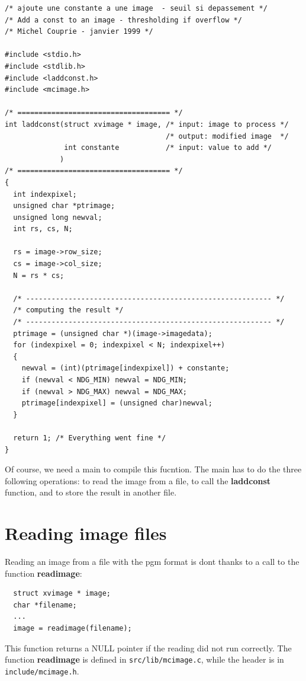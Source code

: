 \documentclass{article}
\begin{document}
\begin{verbatim}
/* ajoute une constante a une image  - seuil si depassement */
/* Add a const to an image - thresholding if overflow */
/* Michel Couprie - janvier 1999 */

#include <stdio.h>
#include <stdlib.h>
#include <laddconst.h>
#include <mcimage.h>

/* ==================================== */
int laddconst(struct xvimage * image, /* input: image to process */
                                      /* output: modified image  */
              int constante           /* input: value to add */
             )
/* ==================================== */
{
  int indexpixel;
  unsigned char *ptrimage;
  unsigned long newval;
  int rs, cs, N;

  rs = image->row_size;
  cs = image->col_size;
  N = rs * cs;
  
  /* ---------------------------------------------------------- */
  /* computing the result */
  /* ---------------------------------------------------------- */
  ptrimage = (unsigned char *)(image->imagedata);
  for (indexpixel = 0; indexpixel < N; indexpixel++)
  {
    newval = (int)(ptrimage[indexpixel]) + constante;
    if (newval < NDG_MIN) newval = NDG_MIN;
    if (newval > NDG_MAX) newval = NDG_MAX;
    ptrimage[indexpixel] = (unsigned char)newval;
  }

  return 1; /* Everything went fine */
}
\end{verbatim}

Of course, we need a main to compile this fucntion. The main has to do
the three following operations: to read the image from a file, to call
the {\bf laddconst} function, and to store the result in another file.

\section{Reading image files}

Reading an image from a file with the pgm format is dont thanks to a
call to the function {\bf readimage}:

\begin{verbatim}
  struct xvimage * image;
  char *filename;
  ...
  image = readimage(filename);  
\end{verbatim}

This function returns a NULL pointer if the reading did not run
correctly. The function {\bf readimage} is defined in
\verb|src/lib/mcimage.c|, while the header is in
\verb|include/mcimage.h|.
\end{document}
